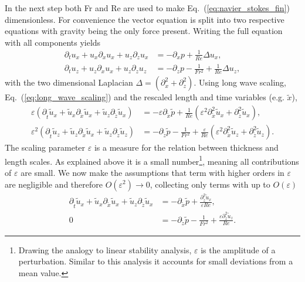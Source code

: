 In the next step both Fr and Re are used to make Eq.~(\ref{eq:navier_stokes_fin}) dimensionless.
For convenience the vector equation is split into two respective equations with gravity being the only force present.
Writing the full equation with all components yields
\begin{align}\label{eq:2d_RNS}
    \partial_t u_x + u_x\partial_x u_x + u_z\partial_z u_x &= -\partial_x p + \frac{1}{Re}\Delta u_x ,\\
    \partial_t u_z + u_z\partial_x u_x + u_z\partial_z u_z &= -\partial_z p - \frac{1}{Fr^2} + \frac{1}{Re}\Delta u_z ,
\end{align}
with the two dimensional Laplacian $\Delta = (\partial_x^2 + \partial_z^2)$.
Using long wave scaling, Eq.~(\ref{eq:long_wave_scaling}) and the rescaled length and time variables (e.g. $\tilde{x}$),
\begin{align}\label{eq:2d_RNS_eps}
    \varepsilon(\partial_{\tilde{t}} \tilde{u}_x + \tilde{u}_x \partial_{\tilde{x}} \tilde{u}_x + \tilde{u}_z \partial_{\tilde{z}} \tilde{u}_x ) &= -\varepsilon\partial_{\tilde{x}} \tilde{p} + \frac{1}{Re}(\varepsilon^2 \partial_{\tilde{x}}^2 \tilde{u}_x + \partial_{\tilde{z}}^2 \tilde{u}_x ) ,\\
    \varepsilon^2(\partial_{\tilde{t}} \tilde{u}_z + \tilde{u}_z\partial_{\tilde{x}} \tilde{u}_x + \tilde{u}_z\partial_{\tilde{z}} \tilde{u}_z) &= -\partial_{\tilde{z}}\tilde{p} - \frac{1}{Fr^2} + \frac{\varepsilon}{Re}(\varepsilon^2 \partial_{\tilde{x}}^2 \tilde{u}_z + \partial_{\tilde{z}}^2 \tilde{u}_z ) .
\end{align}
The scaling parameter $\varepsilon$ is a measure for the relation between thickness and length scales. 
As explained above it is a small number\footnote{Drawing the analogy to linear stability analysis, $\varepsilon$ is the amplitude of a perturbation. Similar to this analysis it accounts for small deviations from a mean value.}, meaning all contributions of $\varepsilon$ are small.
We now make the assumptions that term with higher orders in $\varepsilon$ are negligible and therefore $O(\varepsilon^2) \rightarrow 0$, collecting only terms with up to $O(\varepsilon)$
\begin{align}\label{eq:2d_RNS_linear}
    \partial_{\tilde{t}} \tilde{u}_x + \tilde{u}_x\partial_{\tilde{x}} \tilde{u}_x + \tilde{u}_z\partial_{\tilde{z}} \tilde{u}_x &= -\partial_{\tilde{x}} \tilde{p} + \frac{\partial_{\tilde{z}}^2\tilde{u}_x}{\varepsilon Re}, \\
    0 &= -\partial_{\tilde{z}}\tilde{p} - \frac{1}{Fr^2} + \frac{\varepsilon\partial_{\tilde{z}}^2 \tilde{u}_z}{Re} .
\end{align}
